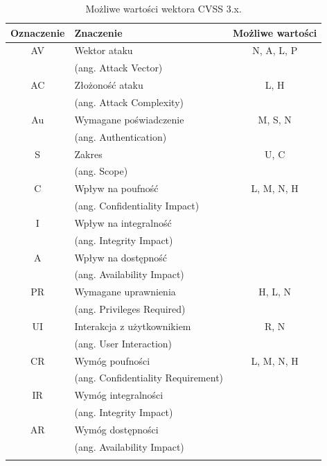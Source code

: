 \begin{table}[tbh]
\caption{Możliwe wartości wektora CVSS 3.x.}
\begin{center}
\label{tab:chapter1:cvss_vector_3}
\begin{tabular}{clc}
\hline \noalign {\smallskip}
\textbf{Oznaczenie} & \textbf{Znaczenie} & \textbf{Możliwe wartości} \\
\hline \noalign {\smallskip}
AV & Wektor ataku  & N, A, L, P \\
   & (ang. Attack Vector) &          \\

\hline \noalign {\smallskip}
AC & Złożoność ataku   &  L, H \\
   & (ang. Attack  Complexity) & \\

\hline \noalign {\smallskip}
Au & Wymagane poświadczenie   & M, S, N \\
   & (ang. Authentication) & \\

\hline \noalign {\smallskip}
S & Zakres   & U, C \\
   & (ang. Scope) & \\

\hline \noalign {\smallskip}
C &  Wpływ na poufność       & L, M, N, H \\
  & (ang. Confidentiality Impact) & \\
I & Wpływ na integralność    & \\
  & (ang. Integrity Impact)       & \\ 
A & Wpływ na dostępność      & \\
  & (ang. Availability Impact)    & \\

\hline \noalign {\smallskip}
PR & Wymagane uprawnienia  & H, L, N \\
   & (ang. Privileges Required) & \\

\hline \noalign {\smallskip}
UI & Interakcja z użytkownikiem  & R, N \\
   & (ang. User Interaction) & \\

\hline \noalign {\smallskip}
CR & Wymóg poufności               & L, M, N, H \\
   & (ang. Confidentiality Requirement) & \\
IR & Wymóg integralności           & \\
   & (ang. Integrity Impact)            & \\
AR & Wymóg dostępności             & \\
   & (ang. Availability Impact)         & \\

\hline \noalign {\smallskip}
\end{tabular}
\end{center}
\end{table}

